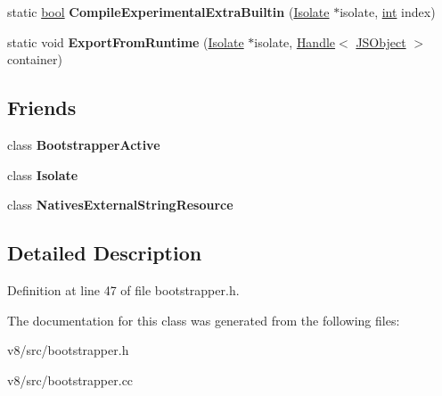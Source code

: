 \begin{DoxyCompactItemize}
\item 
\mbox{\label{classv8_1_1internal_1_1Bootstrapper_a9a29ce6115edf6e3bce85c50c32b7b1d}} 
static \mbox{\hyperlink{classbool}{bool}} {\bfseries Compile\+Experimental\+Extra\+Builtin} (\mbox{\hyperlink{classv8_1_1internal_1_1Isolate}{Isolate}} $\ast$isolate, \mbox{\hyperlink{classint}{int}} index)
\item 
\mbox{\label{classv8_1_1internal_1_1Bootstrapper_a39826d28eb8d93bf081b9308e3848d24}} 
static void {\bfseries Export\+From\+Runtime} (\mbox{\hyperlink{classv8_1_1internal_1_1Isolate}{Isolate}} $\ast$isolate, \mbox{\hyperlink{classv8_1_1internal_1_1Handle}{Handle}}$<$ \mbox{\hyperlink{classv8_1_1internal_1_1JSObject}{J\+S\+Object}} $>$ container)
\end{DoxyCompactItemize}
\subsection*{Friends}
\begin{DoxyCompactItemize}
\item 
\mbox{\label{classv8_1_1internal_1_1Bootstrapper_a8d5d5e652a3096853b619c4dd4f99827}} 
class {\bfseries Bootstrapper\+Active}
\item 
\mbox{\label{classv8_1_1internal_1_1Bootstrapper_aba4f0964bdacf2bbf62cf876e5d28d0a}} 
class {\bfseries Isolate}
\item 
\mbox{\label{classv8_1_1internal_1_1Bootstrapper_a4434d79432d349e28ca43c4c89922578}} 
class {\bfseries Natives\+External\+String\+Resource}
\end{DoxyCompactItemize}


\subsection{Detailed Description}


Definition at line 47 of file bootstrapper.\+h.



The documentation for this class was generated from the following files\+:\begin{DoxyCompactItemize}
\item 
v8/src/bootstrapper.\+h\item 
v8/src/bootstrapper.\+cc\end{DoxyCompactItemize}
